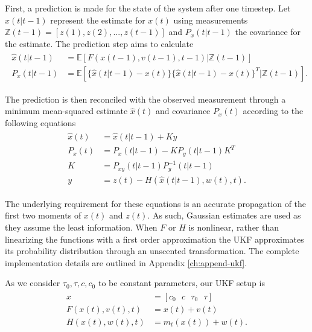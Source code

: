 First, a prediction is made for the state of the system after one timestep. Let $\hat{x}(t\vert t-1)$ represent the estimate for $x(t)$ using measurements $\mathbb{Z}(t-1)=[z(1), z(2), ..., z(t-1)]$ and $P_{x}(t\vert t-1)$ the covariance for the estimate. The prediction step aims to calculate
\begin{align}\begin{split}
  \hat{x}(t\vert t-1) &= \mathbb{E}[F(x(t-1), v(t-1), t-1)\vert \mathbb{Z}(t-1)]\\
  P_{x}(t\vert t-1) &= \mathbb{E}[\{ \hat{x}(t\vert t-1) - x(t) \} \{ \hat{x}(t\vert t-1) - x(t) \}^T \vert \mathbb{Z}(t-1)].
\end{split}\end{align}

The prediction is then reconciled with the observed measurement through a minimum mean-squared estimate $\hat{x}(t)$ and covariance $P_{x}(t)$ according to the following equations
\begin{align}
\begin{split}
  \hat{x}(t) &= \hat{x}(t\vert t-1) + Ky \\
  P_{x}(t) &= P_{x}(t\vert t-1) - KP_{y}(t\vert t-1) K^T\\
  K &= P_{xy}(t\vert t-1) P_{y}^{-1}(t\vert t-1)\\
  y &= z(t) - H(\hat{x}(t\vert t-1) , w(t), t).
\end{split}
\end{align}

The underlying requirement for these equations is an accurate propagation of the first two moments of $x(t)$ and $z(t)$. As such, Gaussian estimates are used as they assume the least information. When $F$ or $H$ is nonlinear, rather than linearizing the functions with a first order approximation the UKF approximates its probability distribution through an unscented transformation. The complete implementation details are outlined in Appendix \ref{ch:append-ukf}.

As we consider $\tau_0, \tau, c, c_0$ to be constant parameters, our UKF setup is
\begin{align}
\begin{split}
  x &= [c_0 \text{ } c \text{ } \tau_0 \text{ } \tau]\\
  F(x(t), v(t), t) &= x(t) + v(t)\\
  H(x(t), w(t), t) &= m_t(x(t)) + w(t).
\end{split}
\end{align}

